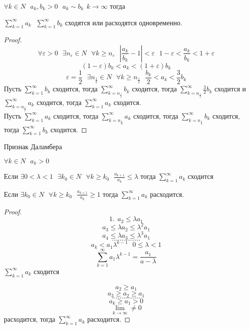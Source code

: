 \begin{block}
  $\forall k \in N ~~~ a_k, b_k > 0 ~~~ a_k \sim b_k ~~ k \to \infty$ тогда

  $\sum_{k=1}^{\infty} a_k ~~~ \sum_{k=1}^{\infty} b_k$
  сходятся или расходятся одновременно.
\end{block}

\begin{proof}
  $$
  \forall \varepsilon > 0 ~~~ \exists n_{\varepsilon} \in N ~~~
  \forall k \ge n_{\varepsilon} ~~~
  \left| \frac{a_k}{b_k} -1 \right| < \varepsilon ~~~
  1 - \varepsilon < \frac{a_k}{b_k} < 1 + \varepsilon
  $$
  $$
  (1 - \varepsilon)b_k < a_k < (1 + \varepsilon)b_k
  $$
  $$
  \varepsilon = \frac{1}{2} ~~~
  \exists n_{\frac{1}{2}} \in N ~~~
  \forall k \ge n_{\frac{1}{2}} ~~~
  \frac{b_k}{2} < a_k < \frac{3}{2} b_k
  $$
  Пусть $\sum_{k=1}^{\infty} b_k$ сходится, тогда
  $\sum_{k=n_{\frac{1}{2}}}^{\infty} b_k$ сходится, тогда
  $\sum_{k=n_{\frac{1}{2}}}^{\infty} \frac{3}{2} b_k$ сходится и
  $\sum_{k=n_{\frac{1}{2}}}^{\infty} a_k$ сходится, тогда
  $\sum_{k=1}^{\infty} a_k$ сходится.\\

  Пусть $\sum_{k=1}^{\infty} a_k$ сходится, тогда
  $\sum_{k=n_{\frac{1}{2}}}^{\infty} a_k$ сходится, тогда
  $\sum_{k=n_{\frac{1}{2}}}^{\infty} b_k$ сходится, тогда
  $\sum_{k=1}^{\infty} b_k$ сходится.
\end{proof}

\begin{title}
  Признак Даламбера
\end{title}

\begin{block}
  $\forall k \in N ~~~ a_k > 0$

  Если $\exists 0 < \lambda < 1 ~~~ \exists k_0 \in N ~~~ \forall k \ge k_0 ~~~
  \frac{a_{k+1}}{a_k} \le \lambda$ тогда $\sum_{k=1}^{\infty} a_k$ сходится

  Если $\exists k_0 \in N ~~~ \forall k \ge k_0 ~~~ \frac{a_{k+1}}{a_k} \ge 1$
  тогда $\sum_{k=1}^{\infty} a_k$ расходится.
\end{block}

\begin{proof}
  $$
  1. ~~ a_2 \le \lambda a_1
  $$
  $$
  a_3 \le \lambda a_2 \le \lambda^2 a_1
  $$
  $$
  a_4 \le \lambda a_3 \le \lambda^3 a_1
  $$
  $$
  \ldots \ldots \ldots \ldots \ldots
  $$
  $$
  a_k < a_1 \lambda^{k-1} ~~~ 0 \le \lambda < 1
  $$
  $$
  \sum_{k=1}^{\infty} a_1 \lambda^{k-1} = \frac{a_1}{a-\lambda}
  $$
  $\sum_{k=1}^{\infty} a_k$ сходится

  $$
  a_2 \ge a_1
  $$
  $$
  a_3 \ge a_2 \ge a_1
  $$
  $$
  \ldots \ldots \ldots \ldots \ldots
  $$
  $$
  a_k \ge a_1 > 0
  $$
  $$
  \lim_{k \to \infty} \not= 0
  $$
  расходится, тогда $\sum_{k=1}^{\infty} a_k$ расходится.
\end{proof}

